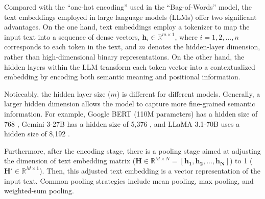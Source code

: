 






Compared with the ``one-hot encoding'' used in the ``Bag-of-Words'' model, the text embeddings employed in large language models (LLMs) offer two significant advantages. On the one hand, text embeddings employ a tokenizer to map the input text into a sequence of dense vectors, $\mathbf{h}_i \in \mathbb{R}^{m\times 1}$, where $i = 1, 2, ..., n$ corresponds to each token in the text, and $m$ denotes the hidden-layer dimension, rather than high-dimensional binary representations. On the other hand, the hidden layers within the LLM transform each token vector into a contextualized embedding by encoding both semantic meaning and positional information.

Noticeably, the hidden layer size ($m$) is different for different models. Generally, a larger hidden dimension allows the model to capture more fine-grained semantic information. For example, Google BERT (110M parameters) has a hidden size of 768 \cite{googlebert}, Gemini 3-27B has a hidden size of 5,376 \cite{googlegemini3}, and LLaMA 3.1-70B uses a hidden size of 8,192 \cite{metallama3}.


Furthermore, after the encoding stage, there is a pooling stage aimed at adjusting the dimension of text embedding matrix ($\mathbf{H} \in \mathbb{R}^{M\times N} = [\mathbf{h_1}, \mathbf{h_2}, ..., \mathbf{h_N}]$) to 1 ($\mathbf{H'} \in {\mathbb{R}^{M\times 1}}$). Then, this adjusted text embedding is a vector representation of the input text. Common pooling strategies include mean pooling, max pooling, and weighted-sum pooling. 

